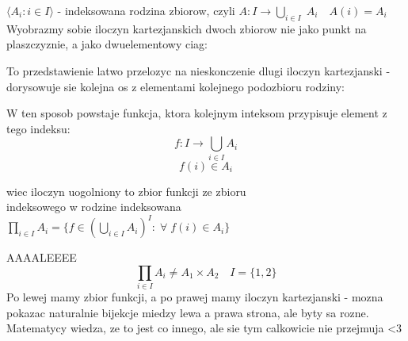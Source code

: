\documentclass{article}
\begin{document}
  $\langle A_i:i\in I\rangle$ - indeksowana rodzina zbiorow, czyli \color{acc}$A: I\to \bigcup\limits_{i\in I}\;A_i\quad A(i)=A_i$\color{txt}\medskip\\
  Wyobrazmy sobie iloczyn kartezjanskich dwoch zbiorow nie jako punkt na plaszczyznie, a jako dwuelementowy ciag:
  \begin{center}\end{center}
  To przedstawienie latwo przelozyc na nieskonczenie dlugi iloczyn kartezjanski - dorysowuje sie kolejna os z elementami kolejnego podozbioru rodziny:
  \begin{center}\end{center}
  W ten sposob powstaje funkcja, ktora kolejnym inteksom przypisuje element z tego indeksu:
  $$f:I\to\bigcup\limits_{i\in I}A_i$$
  $$f(i) \in A_i$$
  \begin{center}
    wiec \color{def}iloczyn uogolniony to zbior funkcji \color{txt}ze zbioru \\indeksowego w rodzine indeksowana\smallskip\\
    $\prod\limits_{i\in I}A_i=\{f\in(\bigcup\limits_{i\in I}A_i)^I:\;\forall\;f(i)\in A_i\}$
  \end{center}
  AAAALEEEE
  $$\prod\limits_{i\in I}A_i\neq A_1\times A_2\quad I=\{1, 2\}$$
  Po lewej mamy zbior funkcji, a po prawej mamy iloczyn kartezjanski - mozna pokazac naturalnie bijekcje miedzy lewa a prawa strona, ale byty sa rozne. Matematycy wiedza, ze to jest co innego, ale sie tym calkowicie nie przejmuja <3
\end{document}
